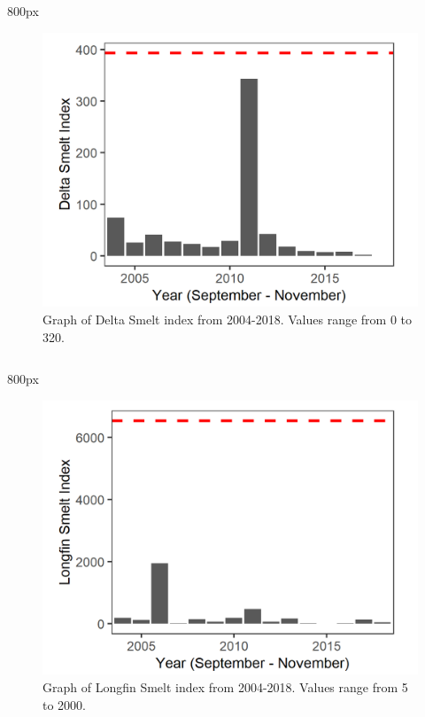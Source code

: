 \documentclass[
]{book}
\begin{document}
\begin{column}{800px\textwidth}
\begin{figure}
\includegraphics[width=15.25in]{figures/FMWT_DS_2004} \caption{Graph of Delta Smelt index from 2004-2018. Values range from 0 to 320.}\label{fig:unnamed-chunk-139}
\end{figure}
\end{column}

\begin{column}{800px\textwidth}
\begin{figure}
\includegraphics[width=15.25in]{figures/FMWT_LFS_2004} \caption{Graph of Longfin Smelt index from 2004-2018. Values range from 5 to 2000.}\label{fig:unnamed-chunk-140}
\end{figure}
\end{column}
\end{document}
